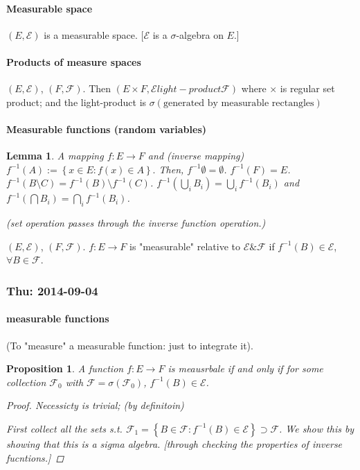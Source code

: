 \documentclass[11pt]{article}
\newtheorem{lemma}[theorem]{Lemma}
\newtheorem{proposition}[theorem]{Proposition}
\begin{document}
\paragraph{Measurable space }
$(E, \mathcal E)$ is a measurable space. [$\mathcal E$ is a $\sigma$-algebra on
$E$.]

\paragraph{Products of measure spaces} $(E, \mathcal E)$, $(F, \mathcal F)$.
Then $\left( E \times F, \mathcal E light-product \mathcal F \right)$ where
$\times$ is regular set product; and the light-product is $\sigma \left( \text{
generated by measurable rectangles} 
\right)$

\paragraph{Measurable functions (random variables)}
\begin{lemma}
  A mapping $f: E\to F$ and (inverse mapping) $f^{-1} (A) := \left\{ x \in E :
    f(x) \in A
  \right\}.$ Then, $f^{-1} \emptyset = \emptyset$. $f^{-1}(F) = E$. $f^{-1}
  (B\setminus C) = f^{-1} (B) \setminus f^{-1} (C)$. 
  $f^{-1}\left( \bigcup _ i B_i \right) = \bigcup _i f^{-1}(B_i)$ and $f^{-1}\left( \bigcap B_i \right) =
  \bigcap _ i f^{-1}\left( B_i \right)$.


  (set operation passes through the inverse function operation.)
  \label{lemma:measurable-function}
\end{lemma}


\begin{definition}
  $(E, \mathcal E)$, $(F, \mathcal F)$. $f: E\to F$ is "measurable" relative to
  $\mathcal E \& \mathcal F$ if $f^{-1}(B) \in \mathcal E$, $\forall B \in
  \mathcal F$. 
\end{definition}




\subsubsection{Thu: 2014-09-04 }
\paragraph{measurable functions}
(To "measure" a measurable function: just to integrate it).

\begin{proposition}
  A function $f: E \to F$ is meausrbale if and only if for some collection
  $\mathcal F_0$ with $\mathcal F = \sigma ( \mathcal F _0)$, $f^{-1}(B) \in
  \mathcal E$.
  \begin{proof}
    Necessicty is trivial; (by definitoin)

    First collect all the sets s.t. $\mathcal F_1 = \left\{ B \in \mathcal F :
      f^{-1}(B) \in \mathcal E \right\} \supset \mathcal F$. We show this by
      showing that this is a sigma algebra.  [through checking the properties of
      inverse fucntions.]
    \end{proof}
  \end{proposition}
\end{document}
